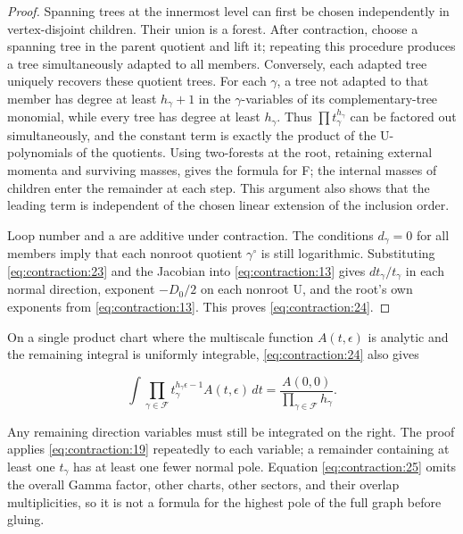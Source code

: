 \documentclass[11pt,a4paper,oneside]{article}
\theoremstyle{plain}
\theoremstyle{definition}
\theoremstyle{remark}
\numberwithin{equation}{section}
\begin{document}
\begin{proof}

Spanning trees at the innermost level can first be chosen independently in vertex-disjoint children. Their union is a forest. After contraction, choose a spanning tree in the parent quotient and lift it; repeating this procedure produces a tree simultaneously adapted to all members. Conversely, each adapted tree uniquely recovers these quotient trees. For each \(\gamma \), a tree not adapted to that member has degree at least \(h_\gamma +1\) in the \(\gamma \)-variables of its complementary-tree monomial, while every tree has degree at least \(h_\gamma \). Thus \(\prod t_\gamma ^{h_\gamma }\) can be factored out simultaneously, and the constant term is exactly the product of the U-polynomials of the quotients. Using two-forests at the root, retaining external momenta and surviving masses, gives the formula for F; the internal masses of children enter the remainder at each step. This argument also shows that the leading term is independent of the chosen linear extension of the inclusion order.

Loop number and a are additive under contraction. The conditions \(d_\gamma =0\) for all members imply that each nonroot quotient \(\gamma ^\circ\) is still logarithmic. Substituting \eqref{eq:contraction:23} and the Jacobian into \eqref{eq:contraction:13} gives \(dt_\gamma /t_\gamma \) in each normal direction, exponent \(- D_0/2\) on each nonroot U, and the root's own exponents from \eqref{eq:contraction:13}. This proves \eqref{eq:contraction:24}.

\end{proof}

On a single product chart where the multiscale function \(A(t,\epsilon )\) is analytic and the remaining integral is uniformly integrable, \eqref{eq:contraction:24} also gives

\begin{equation}
[\epsilon^{-|\mathscr F|}]\int\prod_{\gamma\in\mathscr F}
                t_\gamma^{h_\gamma\epsilon-1}A(t,\epsilon)\,dt
                       =\frac{A(0,0)}{\prod_{\gamma\in\mathscr F}h_\gamma}.
                                                                    \label{eq:contraction:25}
\end{equation}

Any remaining direction variables must still be integrated on the right. The proof applies \eqref{eq:contraction:19} repeatedly to each variable; a remainder containing at least one \(t_\gamma \) has at least one fewer normal pole. Equation \eqref{eq:contraction:25} omits the overall Gamma factor, other charts, other sectors, and their overlap multiplicities, so it is not a formula for the highest pole of the full graph before gluing.
\end{document}
